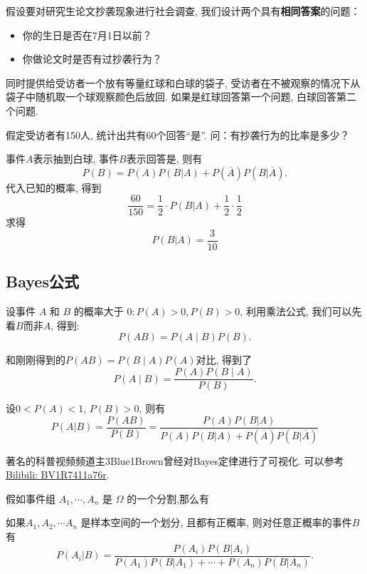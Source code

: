 \begin{example}
    假设要对研究生论文抄袭现象进行社会调查, 我们设计两个具有\textbf{相同答案}的问题：
    \begin{itemize}
        \item 你的生日是否在7月1日以前？
        \item 你做论文时是否有过抄袭行为？
    \end{itemize}
    同时提供给受访者一个放有等量红球和白球的袋子, 
    受访者在不被观察的情况下从袋子中随机取一个球观察颜色后放回. 
    如果是红球回答第一个问题, 白球回答第二个问题. 

    假定受访者有150人, 统计出共有60个回答``是''. 问：有抄袭行为的比率是多少？
\end{example}

\begin{solution}
    事件$A$表示抽到白球, 事件$B$表示回答是, 则有
    $$P(B)=P(A)P(B|A)+P(\overline{A})P(B|\overline{A}).$$
    代入已知的概率, 得到
    $$\frac{60}{150}=\frac12\cdot P(B|A)+\frac12\cdot\frac12 $$
    求得
    $$P(B|A)=\frac{3}{10}$$
\end{solution}

\subsection{Bayes公式}
设事件 $A$ 和 $B$ 的概率大于 $0: P(A)>0, P(B)>0$, 利用乘法公式, 我们可以先看$B$而非$A$, 得到: 
$$P(A B)=P(A \mid B) P(B).$$

和刚刚得到的$P(A B)=P(B \mid A) P(A)$对比, 得到了$$P(A \mid B)=\frac{P(A) P(B \mid A)}{P(B)}.$$

\begin{theorem}[Bayes定理]
    设$0<P(A)<1$, $P(B)>0$, 则有
    $$P(A|B)=\frac{ P(AB)}{ P(B)}
        =\frac{P(A) P(B|A)}{P(A) P(B|A)+P(\overline{A})P(B|\overline{A})}$$
\end{theorem}

\begin{webaside}
    著名的科普视频频道主3Blue1Brown曾经对Bayes定律进行了可视化. 可以参考\href{https://www.bilibili.com/video/BV1R7411a76r}{Bilibili: BV1R7411a76r}.
\end{webaside}
假如事件组 $A_1, \cdots, A_n$ 是 $\Omega$ 的一个分割,那么有

\begin{corollary}
    如果$A_1, A_2, \cdots A_n$ 是样本空间的一个划分, 且都有正概率, 则对任意正概率的事件$B$有
    \[
        P(A_i|B)=\frac{P(A_i)P(B|A_i)}{P(A_1)P(B|A_1)+\cdots+P(A_n)P(B|A_n)}.%
    \]
\end{corollary}

